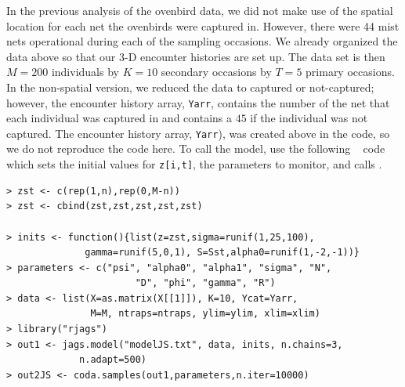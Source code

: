In the previous analysis of the ovenbird data, we did not make use of
the spatial location for each net the ovenbirds were captured in.
However, there were 44 mist nets operational during each of the
sampling occasions.  We already organized the data above so that our
3-D encounter histories are set up.  The data set is then $M=200$
individuals by $K=10$ secondary occasions by $T=5$ primary occasions.
In the non-spatial version, we reduced the data to captured or
not-captured; however, the encounter history array, \mbox{\tt Yarr},
contains the number of the net that each individual was captured in
and contains a $45$ if the individual was not captured.  The encounter
history array, \mbox{\tt Yarr}), was created above in the code, so we
do not reproduce the code here. To call the model, use the following
\R~ code which sets the initial values for \mbox{\tt z[i,t]}, the parameters to
monitor, and calls \jags.

{\small 
\begin{verbatim}
> zst <- c(rep(1,n),rep(0,M-n))
> zst <- cbind(zst,zst,zst,zst,zst)

> inits <- function(){list(z=zst,sigma=runif(1,25,100),
              gamma=runif(5,0,1), S=Sst,alpha0=runif(1,-2,-1))}
> parameters <- c("psi", "alpha0", "alpha1", "sigma", "N",
                       "D", "phi", "gamma", "R")
> data <- list(X=as.matrix(X[[1]]), K=10, Ycat=Yarr,
               M=M, ntraps=ntraps, ylim=ylim, xlim=xlim)
> library("rjags")
> out1 <- jags.model("modelJS.txt", data, inits, n.chains=3,
             n.adapt=500)
> out2JS <- coda.samples(out1,parameters,n.iter=10000)
\end{verbatim}
}


